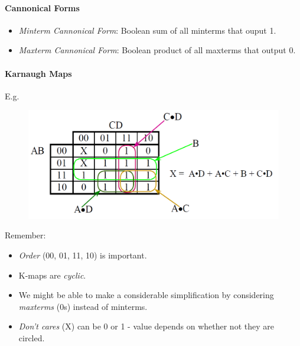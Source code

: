 \documentclass[twocolumn,english]{article}
\begin{document}
\paragraph{Cannonical Forms}
\begin{itemize}
\item \emph{Minterm Cannonical Form}: Boolean sum of all minterms that ouput
1.
\item \emph{Maxterm Cannonical Form}: Boolean product of all maxterms that
output 0.
\end{itemize}

\paragraph{Karnaugh Maps}

E.g.

\begin{figure}[H]
\noindent \centering{}\includegraphics[width=0.25\paperwidth]{img/kmap}
\end{figure}


Remember:
\begin{itemize}
\item \emph{Order} (00, 01, 11, 10) is important.
\item K-maps are \emph{cyclic}.
\item We might be able to make a considerable simplification by considering
\emph{maxterms} (0s) instead of minterms.
\item \emph{Don't cares} (X) can be 0 or 1 - value depends on whether not
they are circled.
\end{itemize}
\end{document}
